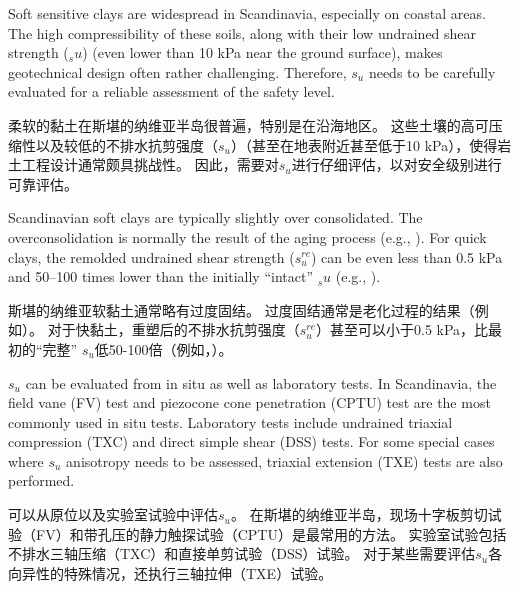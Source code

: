 \begin{ParaColumn}

    Soft sensitive clays are widespread in Scandinavia, especially on coastal areas. The high compressibility of these soils, along with their low undrained shear strength ($_su$) (even lower than 10 kPa near the ground surface), makes geotechnical design often rather challenging. Therefore, $s_u$ needs to be carefully evaluated for a reliable assessment of the safety level.

    \switchcolumn

    柔软的黏土在斯堪的纳维亚半岛很普遍，特别是在沿海地区。 这些土壤的高可压缩性以及较低的不排水抗剪强度（$s_u$）（甚至在地表附近甚至低于10 kPa），使得岩土工程设计通常颇具挑战性。 因此，需要对$s_u$进行仔细评估，以对安全级别进行可靠评估。

    \switchcolumn*

    Scandinavian soft clays are typically slightly over consolidated. The overconsolidation is normally the result of the aging process (e.g., \citealt{Bjerrum19721}). For quick clays, the remolded undrained shear strength ($s_u^{re}$) can be even less than 0.5 kPa and 50–100 times lower than the initially “intact” $_su$ (e.g., \citealt{Rankka2004,Karlsrud20131273}).

    \switchcolumn

    斯堪的纳维亚软黏土通常略有过度固结。 过度固结通常是老化过程的结果（例如\citealt{Bjerrum19721}）。 对于快黏土，重塑后的不排水抗剪强度（$s_u^{re}$）甚至可以小于0.5 kPa，比最初的“完整” $s_u$低50-100倍（例如，\citealt{Rankka2004,Karlsrud20131273}）。

    \switchcolumn*

    $s_u$ can be evaluated from in situ as well as laboratory tests. In Scandinavia, the ﬁeld vane (FV) test and piezocone cone penetration (CPTU) test are the most commonly used in situ tests. Laboratory tests include undrained triaxial compression (TXC) and direct simple shear (DSS) tests. For some special cases where $s_u$ anisotropy needs to be assessed, triaxial extension (TXE) tests are also performed.

    \switchcolumn

    可以从原位以及实验室试验中评估$s_u$。 在斯堪的纳维亚半岛，现场十字板剪切试验（FV）和带孔压的静力触探试验（CPTU）是最常用的方法。 实验室试验包括不排水三轴压缩（TXC）和直接单剪试验（DSS）试验。 对于某些需要评估$s_u$各向异性的特殊情况，还执行三轴拉伸（TXE）试验。


\end{ParaColumn}
